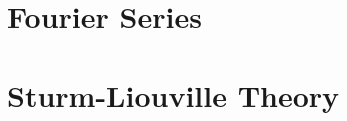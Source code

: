 \documentclass[british,11pt,a4paper]{report}
\begin{document}
\maketitle
\tableofcontents

\chapter{Fourier Series}

\chapter{Sturm-Liouville Theory}

\end{document}
